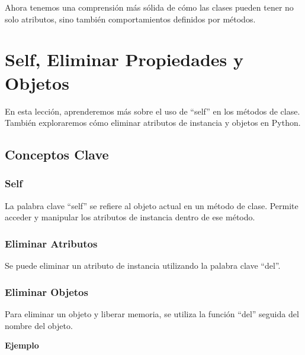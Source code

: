 \documentclass[
  a4paper,
  DIV=11,
  numbers=noendperiod,
  onepage,
  openany]{scrreprt}
\begin{document}
Ahora tenemos una comprensión más sólida de cómo las clases pueden tener
no solo atributos, sino también comportamientos definidos por métodos.

\chapter{Self, Eliminar Propiedades y
Objetos}\label{self-eliminar-propiedades-y-objetos}

En esta lección, aprenderemos más sobre el uso de ``self'' en los
métodos de clase. También exploraremos cómo eliminar atributos de
instancia y objetos en Python.

\section{Conceptos Clave}\label{conceptos-clave-23}

\subsection{Self}\label{self}

La palabra clave ``self'' se refiere al objeto actual en un método de
clase. Permite acceder y manipular los atributos de instancia dentro de
ese método.

\subsection{Eliminar Atributos}\label{eliminar-atributos}

Se puede eliminar un atributo de instancia utilizando la palabra clave
``del''.

\subsection{Eliminar Objetos}\label{eliminar-objetos}

Para eliminar un objeto y liberar memoria, se utiliza la función ``del''
seguida del nombre del objeto.

\textbf{Ejemplo}
\end{document}

